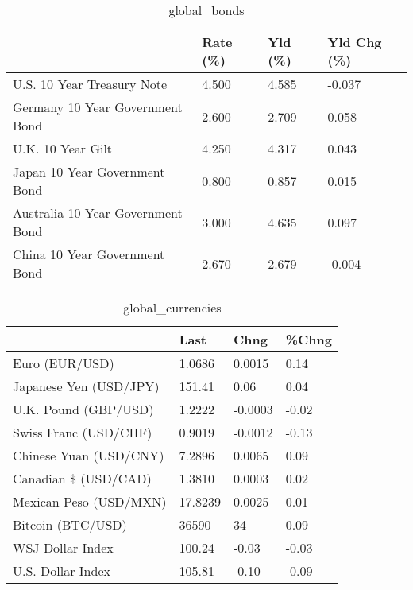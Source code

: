 \documentclass{article}%
\begin{document}
%


\begin{table}[htbp]%
\caption{global\_bonds}%
\centering%
\begin{adjustbox}{width=1\textwidth}%
\begin{tabular}{llll}
\toprule
                                  & Rate (\%) & Yld (\%) & Yld Chg (\%) \\
\midrule
       U.S. 10 Year Treasury Note &    4.500 &   4.585 &      -0.037 \\
  Germany 10 Year Government Bond &    2.600 &   2.709 &       0.058 \\
                U.K. 10 Year Gilt &    4.250 &   4.317 &       0.043 \\
    Japan 10 Year Government Bond &    0.800 &   0.857 &       0.015 \\
Australia 10 Year Government Bond &    3.000 &   4.635 &       0.097 \\
    China 10 Year Government Bond &    2.670 &   2.679 &      -0.004 \\
\bottomrule
\end{tabular}
%
\end{adjustbox}%
\end{table}

%


\begin{table}[htbp]%
\caption{global\_currencies}%
\centering%
\begin{adjustbox}{width=1\textwidth}%
\begin{tabular}{llll}
\toprule
                       &    Last &    Chng & \%Chng \\
\midrule
        Euro (EUR/USD) &  1.0686 &  0.0015 &  0.14 \\
Japanese Yen (USD/JPY) &  151.41 &    0.06 &  0.04 \\
  U.K. Pound (GBP/USD) &  1.2222 & -0.0003 & -0.02 \\
 Swiss Franc (USD/CHF) &  0.9019 & -0.0012 & -0.13 \\
Chinese Yuan (USD/CNY) &  7.2896 &  0.0065 &  0.09 \\
  Canadian \$ (USD/CAD) &  1.3810 &  0.0003 &  0.02 \\
Mexican Peso (USD/MXN) & 17.8239 &  0.0025 &  0.01 \\
     Bitcoin (BTC/USD) &   36590 &      34 &  0.09 \\
      WSJ Dollar Index &  100.24 &   -0.03 & -0.03 \\
     U.S. Dollar Index &  105.81 &   -0.10 & -0.09 \\
\bottomrule
\end{tabular}
%
\end{adjustbox}%
\end{table}
\end{document}
